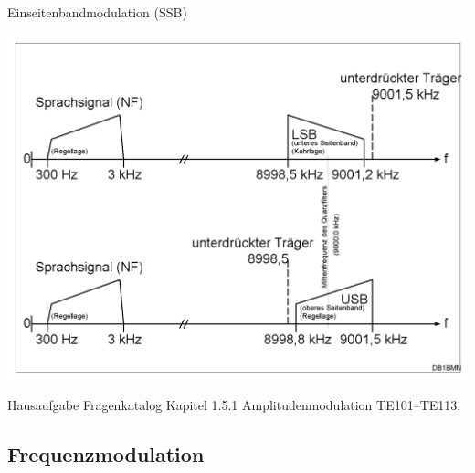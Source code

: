 \begin{frame}{Einseitenbandmodulation (SSB)}
  \begin{center}
    \includegraphics[width=1\textwidth,height=.85\textheight,keepaspectratio]{e16/Ssb-de.png}
    {\tiny \hyperlink{refs}{\cite{wm}}}
  \end{center}
\end{frame}

\begin{frame}
  \begin{exampleblock}{Hausaufgabe}
    Fragenkatalog Kapitel 1.5.1 Amplitudenmodulation TE101--TE113.
  \end{exampleblock}
\end{frame}

\subsection[FM]{Frequenzmodulation}

